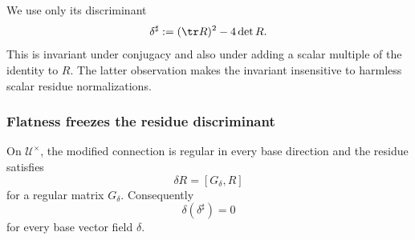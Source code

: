 We use only its discriminant
\begin{equation}\label{eq:res-disc}
  \delta^\sharp
  :=(\tr R)^2-4\det R.
\end{equation}
This is invariant under conjugacy and also under adding a scalar multiple of
the identity to $R$.  The latter observation makes the invariant insensitive
to harmless scalar residue normalizations.

\subsubsection{Flatness freezes the residue discriminant}

\begin{proposition}\label{prop:rank2-rigidity}
%
%
On $\mathcal U^\times$, the modified connection is regular in every base
direction and the residue satisfies
\begin{equation}\label{eq:Lax}
  \delta R=[G_\delta,R]
\end{equation}
for a regular matrix $G_\delta$.  Consequently
\begin{equation}\label{eq:dresdisc}
  \delta(\delta^\sharp)=0
\end{equation}
for every base vector field $\delta$.
\end{proposition}

